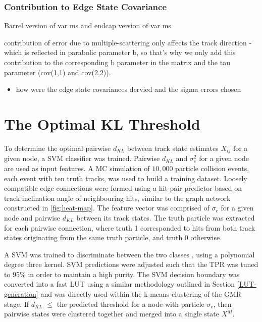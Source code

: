 \subsubsection{Contribution to Edge State Covariance}

Barrel version of var ms and endcap version of var ms.

contribution of error due to multiple-scattering only affects the track direction - which is reflected in parabolic parameter b, so that's why we only add this contribution to the corresponding b parameter in the matrix and the tau parameter (cov(1,1) and cov(2,2)).


\begin{itemize}
\item how were the edge state covariances dervied and the sigma errors chosen

\end{itemize}





\section{The Optimal KL Threshold}
\label{chapter-6-kl-threshold}

To determine the optimal pairwise $d_{KL}$ between track state estimates $X_{ij}$ for a given node, a SVM classifier was trained. Pairwise $d_{KL}$ and $\sigma_{e}^{2}$ for a given node are used as input features. A MC simulation of $10,000$ particle collision events, each event with ten truth tracks, was used to build a training dataset. Loosely compatible edge connections were formed using a hit-pair predictor based on track inclination angle of neighbouring hits, similar to the graph network constructed in \ref{fig:heat-map}. The feature vector was comprised of $\sigma_{e}$ for a given node and pairwise $d_{KL}$ between its track states. The truth particle was extracted for each pairwise connection, where truth 1 corresponded to hits from both track states originating from the same truth particle, and truth 0 otherwise. 


A SVM was trained to discriminate between the two classes \cite{scikit-learn}, using a polynomial degree three kernel. SVM predictions were adjusted such that the TPR was tuned to 95\% in order to maintain a high purity. The SVM decision boundary was converted into a fast LUT using a similar methodology outlined in Section \ref{LUT-generation} and was directly used within the k-means clustering of the GMR stage. If $d_{KL}$ $\leq$ the predicted threshold for a node with particle $\sigma_e$, then pairwise states were clustered together and merged into a single state $X^M$.

